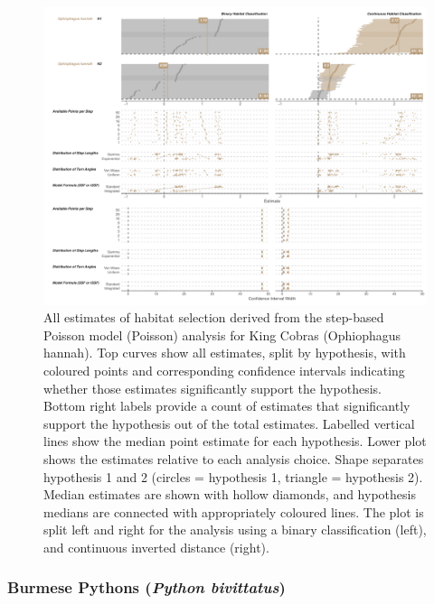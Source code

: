 \documentclass[10pt,a4paper]{article}
\begin{document}
\begin{figure}
\includegraphics[width=1\linewidth]{../../figures/specCurve_Ophiophagus hannah_pois} \caption{All estimates of habitat selection derived from the step-based Poisson model (Poisson) analysis for King Cobras (Ophiophagus hannah). Top curves show all estimates, split by hypothesis, with coloured points and corresponding confidence intervals indicating whether those estimates significantly support the hypothesis. Bottom right labels provide a count of estimates that significantly support the hypothesis out of the total estimates. Labelled vertical lines show the median point estimate for each hypothesis. Lower plot shows the estimates relative to each analysis choice. Shape separates hypothesis 1 and 2 (circles = hypothesis 1, triangle = hypothesis 2). Median estimates are shown with hollow diamonds, and hypothesis medians are connected with appropriately coloured lines. The plot is split left and right for the analysis using a binary classification (left), and continuous inverted distance (right).}\label{fig:specCurvePoisOPHA}
\end{figure}

\subsubsection{\texorpdfstring{Burmese Pythons (\emph{Python bivittatus})}{Burmese Pythons (Python bivittatus)}}\label{burmese-pythons-python-bivittatus}
\end{document}
